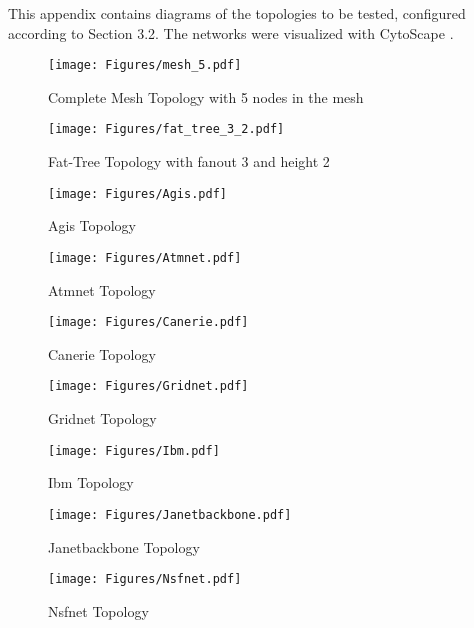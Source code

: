 This appendix contains diagrams of the topologies to be tested, configured according to Section 3.2. The networks were visualized with CytoScape \cite{shannon_cytoscape_2003}.

\begin{figure}
    \centering
    \texttt{[image: Figures/mesh\_5.pdf]}
    \caption{Complete Mesh Topology with 5 nodes in the mesh}
    \label{fig:CompleteMesh}
\end{figure}

\begin{figure}
    \centering
    \texttt{[image: Figures/fat\_tree\_3\_2.pdf]}
    \caption{Fat-Tree Topology with fanout 3 and height 2}
    \label{fig:BalancedTree}
\end{figure}


\begin{figure}[htbp]
    \centering
    \texttt{[image: Figures/Agis.pdf]}
    \caption{Agis Topology}
    \label{fig:Agis}
\end{figure}

\begin{figure}[htbp]
    \centering
    \texttt{[image: Figures/Atmnet.pdf]}
    \caption{Atmnet Topology}
    \label{fig:Atmnet}
\end{figure}

\begin{figure}[htbp]
    \centering
    \texttt{[image: Figures/Canerie.pdf]}
    \caption{Canerie Topology}
    \label{fig:Canerie}
\end{figure}

\begin{figure}[htbp]
    \centering
    \texttt{[image: Figures/Gridnet.pdf]}
    \caption{Gridnet Topology}
    \label{fig:Gridnet}
\end{figure}

\begin{figure}[htbp]
    \centering
    \texttt{[image: Figures/Ibm.pdf]}
    \caption{Ibm Topology}
    \label{fig:Ibm}
\end{figure}

\begin{figure}[htbp]
    \centering
    \texttt{[image: Figures/Janetbackbone.pdf]}
    \caption{Janetbackbone Topology}
    \label{fig:Janetbackbone}
\end{figure}

\begin{figure}[htbp]
    \centering
    \texttt{[image: Figures/Nsfnet.pdf]}
    \caption{Nsfnet Topology}
    \label{fig:Nsfnet}
\end{figure}

